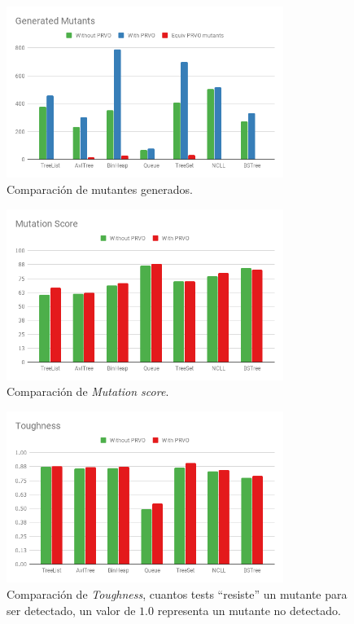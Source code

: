 \begin{figure}
	\begin{center}
		\includegraphics[width=9cm]{figures/Generated_Mutants.png}
	\end{center}
	\caption{Comparaci\'on de mutantes generados.}
	\label{mutants-results}
\end{figure}


\begin{figure}
	\begin{center}
		\includegraphics[width=9cm]{figures/MutationScore.png}
	\end{center}
	\caption{Comparaci\'on de \emph{Mutation score}.}
	\label{mutationscore-results}
\end{figure}

\begin{figure}
	\begin{center}
		\includegraphics[width=9cm]{figures/Toughness.png}
	\end{center}
	\caption{Comparaci\'on de \emph{Toughness}, cuantos tests ``resiste'' un mutante para ser detectado, un valor de $1.0$ representa un mutante no detectado.}
	\label{toughness-results}
\end{figure}

